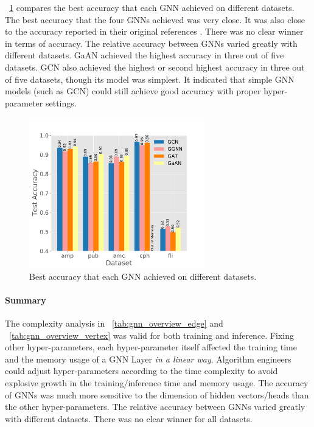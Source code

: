 \figurename~\ref{fig:exp_hyperparameter_on_accuracy_alg_contrast} compares the best accuracy that each GNN achieved on different datasets.
%
The best accuracy that the four GNNs achieved was very close.
%
It was also close to the accuracy reported in their original references \cite{shchur2018_pitfall_of_gnn, zeng2020_graphsaint}.
%
There was no clear winner in terms of accuracy.
%
The relative accuracy between GNNs varied greatly with different datasets.
%
GaAN achieved the highest accuracy in three out of five datasets.
%
GCN also achieved the highest or second highest accuracy in three out of five datasets, though its model was simplest.
%
It indicated that simple GNN models (such as GCN) could still achieve good accuracy with proper hyper-parameter settings.

\begin{figure}[H]
    \centering
    \includegraphics[width=3in]{figs/experiments/exp_hyperparameter_on_accuracy_alg_contrast.pdf}
    \caption{Best accuracy that each GNN achieved on different datasets.}
    \label{fig:exp_hyperparameter_on_accuracy_alg_contrast}
\end{figure}

\paragraph{Summary}

The complexity analysis in \tablename~\ref{tab:gnn_overview_edge} and \tablename~\ref{tab:gnn_overview_vertex} was valid for both training and inference.
%
Fixing other hyper-parameters, each hyper-parameter itself affected the training time and the memory usage of a GNN Layer \emph{in a linear way}.
%
Algorithm engineers could adjust hyper-parameters according to the time complexity to avoid explosive growth in the training/inference time and memory usage.
%
The accuracy of GNNs was much more sensitive to the dimension of hidden vectors/heads than the other hyper-parameters.
%
The relative accuracy between GNNs varied greatly with different datasets.
%
There was no clear winner for all datasets.

